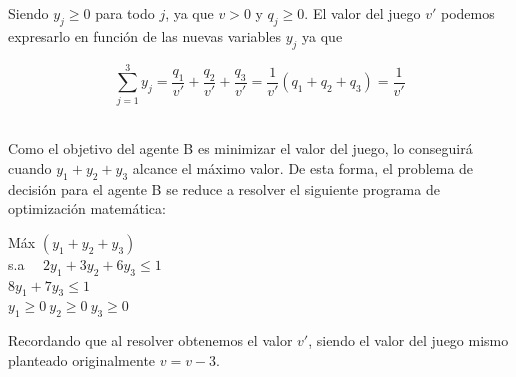 \begin{enumerate}
Siendo $y_j\geq 0$ para todo $j$, ya que $v>0$ y $q_j\geq 0$.
El valor del juego $v'$ podemos expresarlo en función de las nuevas variables $y_j$ ya que\\ 
\begin{center}
    $$\sum_{j=1}^{3} y_j = \frac{q_1}{v'}+\frac{q_2}{v'}+\frac{q_3}{v'}=\frac{1}{v'}(q_1+q_2+q_3)=\frac{1}{v'}$$\\
\end{center}
Como el objetivo del agente B es minimizar el valor del juego, lo conseguirá cuando $y_1+y_2+y_3$ alcance el máximo valor. De esta forma, el problema de decisión para el agente B se reduce a resolver el siguiente programa de optimización matemática:\\

\begin{center}
    Máx    $(y_1+y_2+y_3)$\\
    s.a $\quad 2y_1+3y_2+6y_3\leq 1$\\
    $8y_1+7y_3\leq 1$ \\
    $y_1\geq 0 \: y_2\geq 0 \: y_3\geq 0$\\
\end{center}


Recordando que al resolver obtenemos el valor $v'$, siendo el valor del juego mismo planteado originalmente $v=v-3$.
\end{enumerate}

